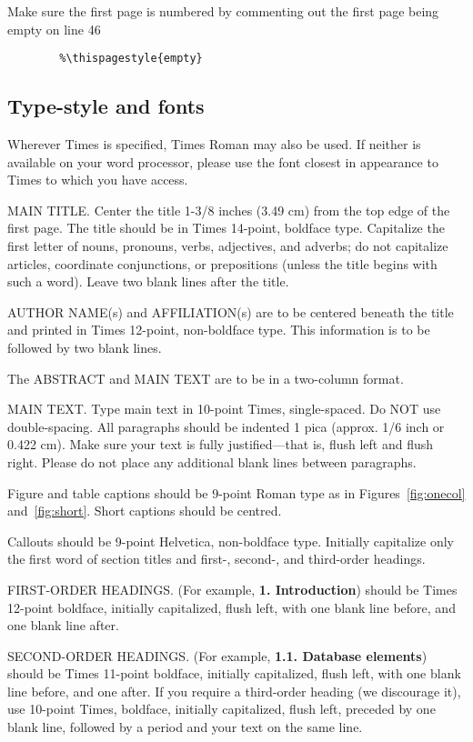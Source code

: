\documentclass[10pt,twocolumn,letterpaper]{article}
\begin{document}
	Make sure the first page is numbered by commenting out the first page being
	empty on line 46
	\begin{verbatim}
		%\thispagestyle{empty}
	\end{verbatim}
	
	
	\subsection{Type-style and fonts}
	
	Wherever Times is specified, Times Roman may also be used. If neither is
	available on your word processor, please use the font closest in
	appearance to Times to which you have access.
	
	MAIN TITLE. Center the title 1-3/8 inches (3.49 cm) from the top edge of
	the first page. The title should be in Times 14-point, boldface type.
	Capitalize the first letter of nouns, pronouns, verbs, adjectives, and
	adverbs; do not capitalize articles, coordinate conjunctions, or
	prepositions (unless the title begins with such a word). Leave two blank
	lines after the title.
	
	AUTHOR NAME(s) and AFFILIATION(s) are to be centered beneath the title
	and printed in Times 12-point, non-boldface type. This information is to
	be followed by two blank lines.
	
	The ABSTRACT and MAIN TEXT are to be in a two-column format.
	
	MAIN TEXT. Type main text in 10-point Times, single-spaced. Do NOT use
	double-spacing. All paragraphs should be indented 1 pica (approx. 1/6
	inch or 0.422 cm). Make sure your text is fully justified---that is,
	flush left and flush right. Please do not place any additional blank
	lines between paragraphs.
	
	Figure and table captions should be 9-point Roman type as in
	Figures~\ref{fig:onecol} and~\ref{fig:short}.  Short captions should be centred.
	
	\noindent Callouts should be 9-point Helvetica, non-boldface type.
	Initially capitalize only the first word of section titles and first-,
	second-, and third-order headings.
	
	FIRST-ORDER HEADINGS. (For example, {\large \bf 1. Introduction})
	should be Times 12-point boldface, initially capitalized, flush left,
	with one blank line before, and one blank line after.
	
	SECOND-ORDER HEADINGS. (For example, { \bf 1.1. Database elements})
	should be Times 11-point boldface, initially capitalized, flush left,
	with one blank line before, and one after. If you require a third-order
	heading (we discourage it), use 10-point Times, boldface, initially
	capitalized, flush left, preceded by one blank line, followed by a period
	and your text on the same line.
	
\end{document}
